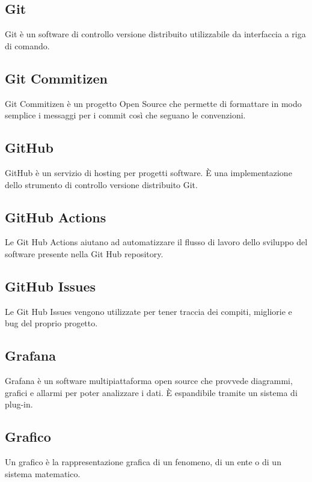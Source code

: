 
\subsection*{Git}
Git è un software di controllo versione distribuito utilizzabile da interfaccia a riga di comando.

\subsection*{Git Commitizen}
Git Commitizen è un progetto Open Source che permette di formattare in modo semplice i messaggi per i commit così che seguano le convenzioni.

\subsection*{GitHub}
GitHub è un servizio di hosting per progetti software. È una implementazione dello strumento di controllo versione distribuito Git.

\subsection*{GitHub Actions}
Le Git Hub Actions aiutano ad automatizzare il flusso di lavoro dello sviluppo del software presente nella Git Hub repository.

\subsection*{GitHub Issues}
Le Git Hub Issues vengono utilizzate per tener traccia dei compiti, migliorie e bug del proprio progetto.

\subsection*{Grafana}
Grafana è un software multipiattaforma open source che provvede diagrammi, grafici e allarmi per poter analizzare i dati. È espandibile tramite un sistema di plug-in.

\subsection*{Grafico}
Un grafico è la rappresentazione grafica di un fenomeno, di un ente o di un sistema matematico.

